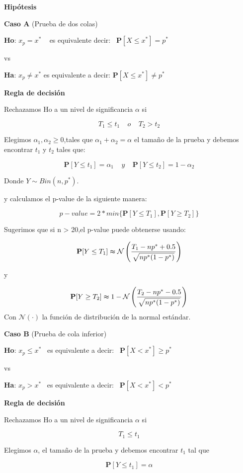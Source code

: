\documentclass[a4paper,oneside,openany]{book}
\begin{document}
\textbf{Hipótesis}

\textbf{Caso A} (Prueba de dos colas)

\textbf{Ho}: \(x_{p} = x^*\) ~ es equivalente decir:
~\(\mathbf{P}[X \leq x^*]= p^*\)

vs

\textbf{Ha}: \(x_{p} \neq x^*\) es equivalente a decir:
\(\mathbf{P}[X \leq x^*]\neq p^*\)

\textbf{Regla de decisión}

Rechazamos Ho a un nivel de significancia \(\alpha\) si

\[T_{1}\leq t_{1} \ \ \ \ \  o   \ \ \ \ \ T_{2}>t_{2}\]

Elegimos \(\alpha_{1},\alpha_{2}\geq 0\),tales que
\(\alpha_{1}+\alpha_{2}=\alpha\) el tamaño de la prueba y debemos
encontrar \(t_{1}\) y \(t_{2}\) tales que:

\[\mathbf{P}[Y \leq t_{1}]=\alpha_{1} \ \ \ \ \  y  \ \ \ \ \ \mathbf{P}[Y \leq t_{2}]=1-\alpha_{2}\]

Donde \(Y \sim Bin (n,p^*)\).

y calculamos el p-value de la siguiente manera:

\[p-value=2*min \{ \mathbf{P}[Y\leq T_{1}],\mathbf{P}[Y \geq T_{2}] \}\]

Sugerimos que si n \textgreater{} 20,el p-value puede obtenerse usando:

\[\mathbf{P}[Y\leq T_{1}] \thickapprox \mathcal{N}\left(\frac{T_{1}-np^*+0.5}{\sqrt{np^*(1-p^*)}}\right)\]

y

\[\mathbf{P}[Y\geq T_{2}] \thickapprox 1-\mathcal{N} \left(\frac{T_{2}-np^*-0.5}{\sqrt{np^*(1-p^*)}}\right)\]
Con \(\mathcal{N}(\cdot)\) la función de distribución de la normal
estándar.

\textbf{Caso B} (Prueba de cola inferior)

\textbf{Ho}: \(x_{p} \leq x^*\) ~es equivalente a decir:
~\(\mathbf{P}[X < x^*]\geq p^*\)

vs

\textbf{Ha}: \(x_{p} > x^*\) ~es equivalente a decir:
~\(\mathbf{P}[X < x^*]< p^*\)

\textbf{Regla de decisión}

Rechazamos Ho a un nivel de significancia \(\alpha\) si

\[T_{1} \leq t_{1}\]

Elegimos \(\alpha\), el tamaño de la prueba y debemos encontrar
\(t_{1}\) tal que

\[\mathbf{P}[Y \leq t_{1}]=\alpha\]
\end{document}
